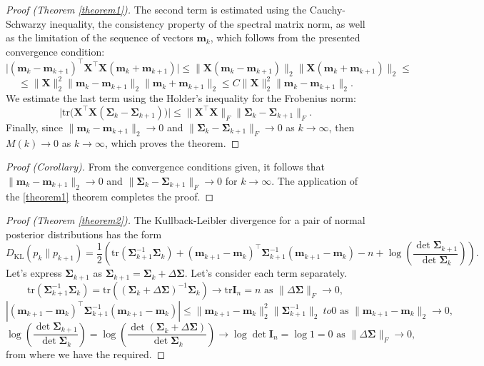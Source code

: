 \documentclass[
11pt,%
tightenlines,%
twoside,%
onecolumn,%
nofloats,%
nobibnotes,%
nofootinbib,%
superscriptaddress,%
noshowpacs,%
centertags]%
{revtex4-2}
\begin{document}
\begin{proof}[Proof (Theorem \ref{theorem1})]
    The second term is estimated using the Cauchy-Schwarzy inequality, the consistency property of the spectral matrix norm, as well as the limitation of the sequence of vectors $\mathbf{m}_k$, which follows from the presented convergence condition:
\[\big| (\mathbf{m}_k - \mathbf{m}_{k+1})^{\top} \mathbf{X}^{\top}\mathbf{X} (\mathbf{m}_k + \mathbf{m}_{k+1}) \big| \leqslant \| \mathbf{X} (\mathbf{m}_k - \mathbf{m}_{k+1}) \|_2 \| \mathbf{X} (\mathbf{m}_k + \mathbf{m}_{k+1}) \|_2 \leqslant \]
    \[ \leqslant \| \mathbf{X} \|_2^2 \| \mathbf{m}_k - \mathbf{m}_{k+1} \|_2 \| \mathbf{m}_k + \mathbf{m}_{k+1} \|_2 \leqslant C \| \mathbf{X} \|_2^2 \| \mathbf{m}_k - \mathbf{m}_{k+1} \|_2. \]
    We estimate the last term using the Holder's inequality for the Frobenius norm:
    \[ \Big| \text{tr} \Big( \mathbf{X}^{\top}\mathbf{X} \left( \mathbf{\Sigma}_k - \mathbf{\Sigma}_{k+1} \right) \Big) \Big| \leqslant \| \mathbf{X}^{\top}\mathbf{X} \|_F \| \mathbf{\Sigma}_k - \mathbf{\Sigma}_{k+1} \|_F. \]
Finally, since $\|\mathbf{m}_k - \mathbf{m}_{k+1} \|_2\to 0$ and $\|\mathbf{\Sigma}_k - \mathbf{\Sigma}_{k+1}\|_{F}\to 0$ as $k\to\infty$, then $M(k)\to 0$ as $k\to \infty$, which proves the theorem.
\end{proof}

\begin{proof}[Proof (Corollary)]
    From the convergence conditions given, it follows that $\|\mathbf{m}_k - \mathbf{m}_{k+1} \|_2\to 0$ and $\|\mathbf{\Sigma}_k -\mathbf{\Sigma}_{k+1}\|_{F}\to 0$ for $k\to \infty$. The application of the \ref{theorem1} theorem completes the proof.
\end{proof}

\begin{proof}[Proof (Theorem \ref{theorem2})]
The Kullback-Leibler divergence for a pair of normal posterior distributions has the form
    \[ D_{\text{KL}}\left( p_k \| p_{k+1} \right) = \dfrac{1}{2} \left( \mathrm{tr}\left( \mathbf{\Sigma}_{k+1}^{-1} \mathbf{\Sigma}_k \right) + (\mathbf{m}_{k+1} - \mathbf{m}_k)^{\top} \mathbf{\Sigma}_{k+1}^{-1} (\mathbf{m}_{k+1} - \mathbf{m}_k) - n + \log{\left( \dfrac{\det \mathbf{\Sigma}_{k+1}}{\det \mathbf{\Sigma}_{k}} \right)} \right). \]
    Let's express $\mathbf{\Sigma}_{k+1}$ as $\mathbf{\Sigma}_{k+1} = \mathbf{\Sigma}_k + \Delta\mathbf{\Sigma}$. Let's consider each term separately.
    \[ \mathrm{tr}\left( \mathbf{\Sigma}_{k+1}^{-1} \mathbf{\Sigma}_k \right) = \mathrm{tr}\left(\left(\mathbf{\Sigma}_k + \Delta \mathbf{\Sigma} \right)^{-1} \mathbf{\Sigma}_k \right) \to \mathrm{tr}\mathbf{I}_n=n\text{ as } \| \Delta \mathbf{\Sigma} \|_F \to 0, \]
    \[ \left| (\mathbf{m}_{k+1} - \mathbf{m}_k)^{\top}\mathbf{\Sigma}_{k+1}^{-1} (\mathbf{m}_{k+1} - \mathbf{m}_k) \right| \leqslant\| \mathbf{m}_{k+1} -\mathbf{m}_k\|_2^2\|\mathbf{\Sigma}_{k+1}^{-1} \|_2 \ to 0 \text{ as } \| \mathbf{m}_{k+1} - \mathbf{m}_k\|_2 \to 0, \]
    \[ \log{\left( \dfrac{\det \mathbf{\Sigma}_{k+1}}{\det \mathbf{\Sigma}_{k}} \right)} = \log{\left( \dfrac{\det \left( \mathbf{\Sigma}_k + \Delta \mathbf{\Sigma} \right)}{\det\mathbf{\Sigma}_{k}} \right)} \to \log \det\mathbf{I}_n = \log 1 = 0 \text{ as } \| \Delta \mathbf{\Sigma} \|_F\to 0, \]
    from where we have the required.
\end{proof}
\end{document}
